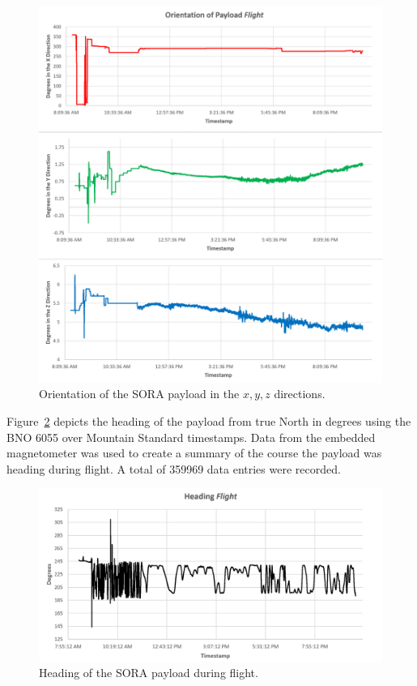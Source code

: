 \begin{figure}[H]
\centering
\includegraphics[width=\textwidth]{./Figures/orientation-xyz.png}
\caption{Orientation of the SORA payload in the $x, y, z$ directions.}
\label{fig:Orientation} 
\end{figure}
\clearpage

Figure~\ref{fig:Heading} depicts the heading of the payload from true North in degrees using the BNO 6055 over Mountain Standard timestamps.  Data from the embedded magnetometer was used to create a summary of the course the payload was heading during flight.  A total of \num{359969} data entries were recorded.

\begin{figure}[H]
\centering
\includegraphics[width=\textwidth]{./Figures/heading.png}
\caption{Heading of the SORA payload during flight.}
\label{fig:Heading} 
\end{figure}

